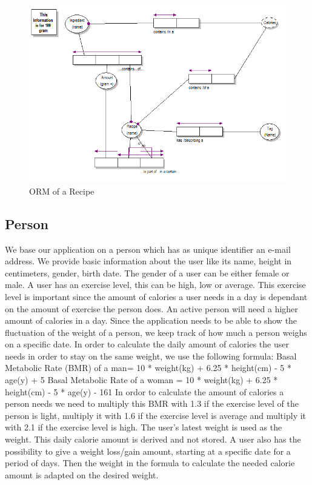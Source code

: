 \documentclass{article}
\begin{document}
  \begin{figure} [h!]
     \includegraphics[width = 1.3\textwidth]{image/Recipe} 
     \caption{ORM of a Recipe}
     \label{fig:twotier}
  \end{figure}
\newpage

\subsection{Person} 

We base our application on a person which has as unique identifier an e-mail address. We provide basic information about the user like its  name, height in centimeters, gender, birth date. The gender of a user can be either female or male. A user has an exercise level, this can be high, low or average. This exercise level is important since the amount of calories a user needs in a day is dependant on the amount of exercise the person does. An active person will need a higher amount of calories in a day. Since the application needs to be able to show the fluctuation of the weight of a person, we keep track of how much a person weighs on a specific date. In order to calculate the daily amount of calories the user needs in order to stay on the same weight, we use the following formula: \newline
Basal Metabolic Rate (BMR) of a man= 10 * weight(kg) + 6.25 * height(cm) - 5 * age(y) + 5 \newline
Basal Metabolic Rate of a  woman = 10 * weight(kg) + 6.25 * height(cm) - 5 * age(y) - 161 \newline
In ordor to calculate the amount of calories a person needs we need to multiply this BMR with 1.3 if the exercise level of the person is light, multiply it with 1.6 if the exercise level is average and multiply it with 2.1 if the exercise level is high. The user's latest weight is used as the weight. This daily calorie amount is derived and not stored. A user also has the possibility to give a weight loss/gain amount, starting at a specific date for a period of days. Then the weight in the formula to calculate the needed calorie amount is adapted on the desired weight. 
\end{document}
